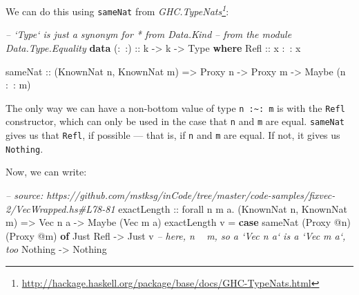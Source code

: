 \documentclass[]{article}
\newenvironment{Shaded}{}{}
\newcommand{\KeywordTok}[1]{\textcolor[rgb]{0.00,0.44,0.13}{\textbf{#1}}}
\newcommand{\DataTypeTok}[1]{\textcolor[rgb]{0.56,0.13,0.00}{#1}}
\newcommand{\CommentTok}[1]{\textcolor[rgb]{0.38,0.63,0.69}{\textit{#1}}}
\newcommand{\OtherTok}[1]{\textcolor[rgb]{0.00,0.44,0.13}{#1}}
\newcommand{\FunctionTok}[1]{\textcolor[rgb]{0.02,0.16,0.49}{#1}}
\newcommand{\NormalTok}[1]{#1}
\renewcommand{\href}[2]{#2\footnote{\url{#1}}}
\begin{document}
We can do this using \texttt{sameNat} from
\emph{\href{http://hackage.haskell.org/package/base/docs/GHC-TypeNats.html}{GHC.TypeNats}}:

\begin{Shaded}
\begin{Highlighting}[]
\CommentTok{-- `Type` is just a synonym for * from Data.Kind}
\CommentTok{-- from the module Data.Type.Equality}
\KeywordTok{data}\OtherTok{ (:~:) ::}\NormalTok{ k }\OtherTok{->}\NormalTok{ k }\OtherTok{->} \DataTypeTok{Type} \KeywordTok{where}
    \DataTypeTok{Refl}\OtherTok{ ::}\NormalTok{ x }\FunctionTok{:~:}\NormalTok{ x}

\NormalTok{sameNat}
\OtherTok{    ::}\NormalTok{ (}\DataTypeTok{KnownNat}\NormalTok{ n, }\DataTypeTok{KnownNat}\NormalTok{ m)}
    \OtherTok{=>} \DataTypeTok{Proxy}\NormalTok{ n}
    \OtherTok{->} \DataTypeTok{Proxy}\NormalTok{ m}
    \OtherTok{->} \DataTypeTok{Maybe}\NormalTok{ (n }\FunctionTok{:~:}\NormalTok{ m)}
\end{Highlighting}
\end{Shaded}

The only way we can have a non-bottom value of type
\texttt{n\ :\textasciitilde{}:\ m} is with the \texttt{Refl} constructor, which
can only be used in the case that \texttt{n} and \texttt{m} are equal.
\texttt{sameNat} gives us that \texttt{Refl}, if possible --- that is, if
\texttt{n} and \texttt{m} are equal. If not, it gives us \texttt{Nothing}.

Now, we can write:

\begin{Shaded}
\begin{Highlighting}[]
\CommentTok{-- source: https://github.com/mstksg/inCode/tree/master/code-samples/fixvec-2/VecWrapped.hs#L78-81}
\OtherTok{exactLength ::}\NormalTok{ forall n m a}\FunctionTok{.}\NormalTok{ (}\DataTypeTok{KnownNat}\NormalTok{ n, }\DataTypeTok{KnownNat}\NormalTok{ m) }\OtherTok{=>} \DataTypeTok{Vec}\NormalTok{ n a }\OtherTok{->} \DataTypeTok{Maybe}\NormalTok{ (}\DataTypeTok{Vec}\NormalTok{ m a)}
\NormalTok{exactLength v }\FunctionTok{=} \KeywordTok{case}\NormalTok{ sameNat (}\DataTypeTok{Proxy} \FunctionTok{@}\NormalTok{n) (}\DataTypeTok{Proxy} \FunctionTok{@}\NormalTok{m) }\KeywordTok{of}
    \DataTypeTok{Just} \DataTypeTok{Refl} \OtherTok{->} \DataTypeTok{Just}\NormalTok{ v     }\CommentTok{-- here, n ~ m, so a `Vec n a` is a `Vec m a`, too}
    \DataTypeTok{Nothing}   \OtherTok{->} \DataTypeTok{Nothing}
\end{Highlighting}
\end{Shaded}
\end{document}

